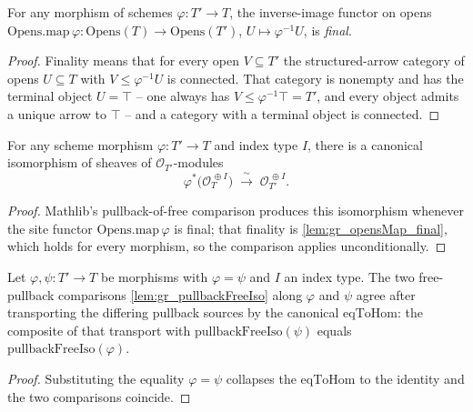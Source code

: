\begin{lemma}
  \label{lem:gr_opensMap_final}
  For any morphism of schemes \(\varphi : T' \to T\), the inverse-image functor on opens
  \(\mathrm{Opens.map}\,\varphi : \mathrm{Opens}(T) \to \mathrm{Opens}(T')\),
  \(U \mapsto \varphi^{-1}U\), is \emph{final}.
\end{lemma}

\begin{proof}


\leanok
  Finality means that for every open \(V \subseteq T'\) the structured-arrow category of
  opens \(U \subseteq T\) with \(V \le \varphi^{-1}U\) is connected. That category is
  nonempty and has the terminal object \(U = \top\) -- one always has
  \(V \le \varphi^{-1}\top = T'\), and every object admits a unique arrow to \(\top\) --
  and a category with a terminal object is connected.
\end{proof}

\begin{lemma}
  \label{lem:gr_pullbackFreeIso}
  For any scheme morphism \(\varphi : T' \to T\) and index type \(I\), there is a canonical
  isomorphism of sheaves of \(\mathcal{O}_{T'}\)-modules
  \[
    \varphi^{*}\bigl(\mathcal{O}_T^{\,\oplus I}\bigr)
      \;\xrightarrow{\ \sim\ }\;
    \mathcal{O}_{T'}^{\,\oplus I}.
  \]
\end{lemma}

\begin{proof}
  \leanok
  Mathlib's pullback-of-free comparison produces this isomorphism whenever the site functor
  \(\mathrm{Opens.map}\,\varphi\) is final; that finality is \cref{lem:gr_opensMap_final},
  which holds for every morphism, so the comparison applies unconditionally.
\end{proof}

\begin{lemma}

  \label{lem:gr_pullbackFreeIso_eqToHom}
  Let \(\varphi, \psi : T' \to T\) be morphisms with \(\varphi = \psi\) and \(I\) an index
  type. The two free-pullback comparisons \cref{lem:gr_pullbackFreeIso} along \(\varphi\) and
  \(\psi\) agree after transporting the differing pullback sources by the canonical
  \(\mathrm{eqToHom}\): the composite of that transport with
  \(\mathrm{pullbackFreeIso}(\psi)\) equals \(\mathrm{pullbackFreeIso}(\varphi)\).
\end{lemma}
\begin{proof}
  \leanok
  Substituting the equality \(\varphi = \psi\) collapses the \(\mathrm{eqToHom}\) to the
  identity and the two comparisons coincide.
\end{proof}

